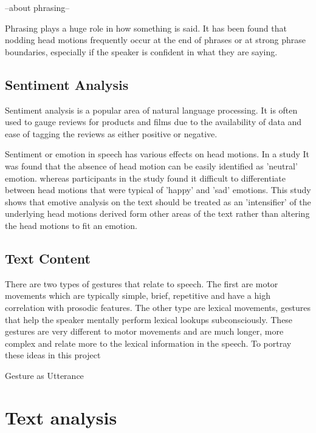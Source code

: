 \documentclass[bsc,frontabs,twoside,singlespacing,parskip]{infthesis}
\begin{document}
--about phrasing--

Phrasing plays a huge role in how something is said. It has been found that nodding head motions frequently occur at the end of phrases or at strong phrase boundaries, especially if the speaker is confident in what they are saying. \cite{ishi2008}  

\subsection{Sentiment Analysis}

Sentiment analysis is a popular area of natural language processing. It is often used to gauge reviews for products\cite{sentiment_online} and films\cite{sentiment_films} due to the availability of data and ease of tagging the reviews as either positive or negative.

Sentiment or emotion in speech has various effects on head motions. In a study It was found that the absence of head motion can be easily identified as 'neutral' emotion. \cite{emotion_head_motion} whereas participants in the study found it difficult to differentiate between head motions that were typical of 'happy' and 'sad' emotions. This study shows that emotive analysis on the text should be treated as an 'intensifier' of the underlying head motions derived form other areas of the text rather than altering the head motions to fit an emotion.



\subsection{Text Content}

There are two types of gestures that relate to speech. \cite{lexical_gestures} The first are motor movements which are typically simple, brief, repetitive and have a high correlation with prosodic features. The other type are lexical movements, gestures that help the speaker mentally perform lexical lookups subconsciously. These gestures are very different to motor movements and are much longer, more complex and relate more to the lexical information in the speech. To portray these ideas in this project 

\cite{kendon} Gesture as Utterance\\

\section{Text analysis}
\end{document}
